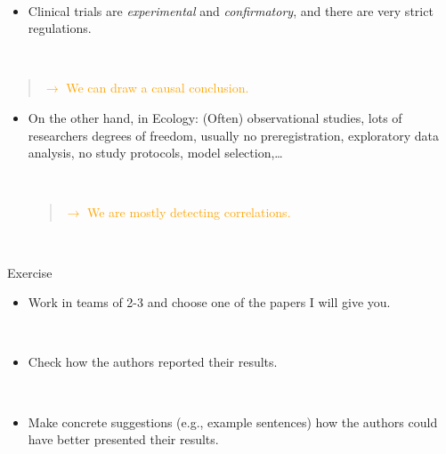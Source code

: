 \documentclass[
  10pt,
  ignorenonframetext,
]{beamer}
\providecommand{\tightlist}{%
  \setlength{\itemsep}{0pt}\setlength{\parskip}{0pt}}
\begin{document}
\begin{frame}
\(~\)

\begin{itemize}
\tightlist
\item
  Clinical trials are \emph{experimental} and \emph{confirmatory}, and
  there are very strict regulations.
\end{itemize}

\(~\)

\begin{quote}
\textcolor{orange}{$\rightarrow$ We can draw a causal conclusion.}
\end{quote}

\vspace{4mm}

\begin{itemize}
\item
  On the other hand, in Ecology: (Often) observational studies, lots of
  researchers degrees of freedom, usually no preregistration,
  exploratory data analysis, no study protocols, model
  selection,\ldots{}

  \(~\)

  \begin{quote}
  \textcolor{orange}{$\rightarrow$ We are mostly detecting correlations.}
  \end{quote}
\end{itemize}

\(~\)
\end{frame}

\begin{frame}{Exercise}
\protect\hypertarget{exercise}{}
\(~\)

\begin{itemize}
\tightlist
\item
  Work in teams of 2-3 and choose one of the papers I will give you.
\end{itemize}

\(~\)

\begin{itemize}
\tightlist
\item
  Check how the authors reported their results.
\end{itemize}

\(~\)

\begin{itemize}
\tightlist
\item
  Make concrete suggestions (e.g., example sentences) how the authors
  could have better presented their results.
\end{itemize}
\end{frame}
\end{document}
